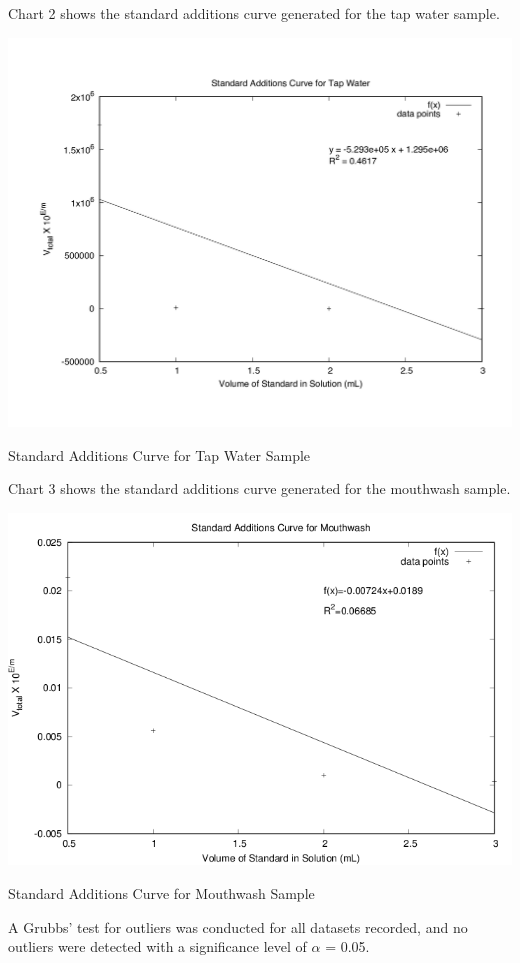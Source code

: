 \documentclass[journal=jacsat,manuscript=article,layout=twocolumn]{achemso}
\begin{document}
Chart 2 shows the standard additions curve generated for the tap water sample.
\begin{chart}
    \includegraphics[scale=0.16]{std_tap}
    \caption{Standard Additions Curve for Tap Water Sample}
\end{chart}

Chart 3 shows the standard additions curve generated for the mouthwash sample.
\begin{chart}
    \includegraphics[scale=0.36]{std_mouthwash} 
    \caption{Standard Additions Curve for Mouthwash Sample}
\end{chart}

A Grubbs' test for outliers was conducted for all datasets recorded, and no
outliers were detected with a significance level of $\alpha$ = 0.05.
\end{document}
